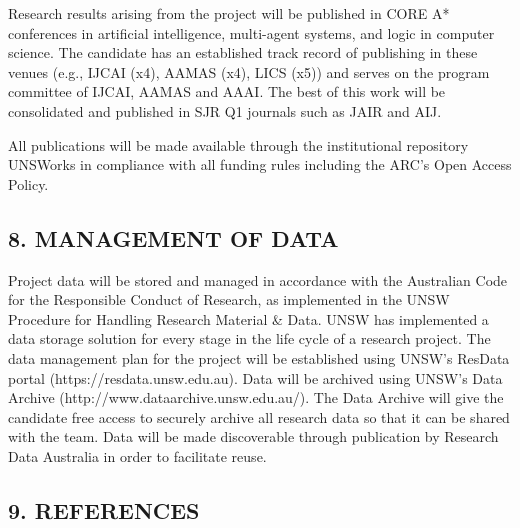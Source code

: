 \documentclass[a4paper,12pt]{scrartcl}
\begin{document}
% 

Research results arising from the project will be published in CORE A* conferences in artificial intelligence, 
multi-agent systems, and logic in computer science. The candidate has an established track record of publishing in 
these venues (e.g., IJCAI (x4), AAMAS (x4), LICS (x5)) and serves on the program committee of IJCAI, AAMAS and AAAI.
The best of this work will be consolidated and published in SJR Q1 journals such as JAIR and AIJ. 

All publications will be made available through the institutional repository UNSWorks in compliance with all funding rules 
including the ARC's Open Access Policy.


\subsection*{8. MANAGEMENT OF DATA}

Project data will be stored and managed in accordance with the Australian Code for the Responsible Conduct of
Research, as implemented in the UNSW Procedure for Handling Research Material \& Data. 
UNSW has implemented a data storage solution for every stage in the life cycle of a research
project. The data management plan for the project will be established using UNSW's ResData portal (https://resdata.unsw.edu.au).
Data will be archived using UNSW's Data Archive (http://www.dataarchive.unsw.edu.au/). The 
Data Archive will give the candidate free access to securely archive all research data so that it can be shared with 
the team. Data will be made discoverable through publication by Research Data Australia in order to facilitate reuse.




\subsection*{9. REFERENCES}



  
\end{document}
